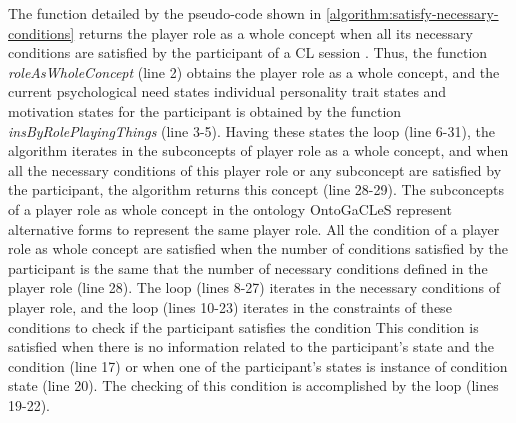 The function  detailed by the pseudo-code shown in \autoref{algorithm:satisfy-necessary-conditions} returns the player role as a whole concept when all its necessary conditions are satisfied by the participant  of a CL session . Thus, the function \emph{roleAsWholeConcept} (line 2) obtains the player role as a whole concept, and the current psychological need states  individual personality trait states  and motivation states  for the participant  is obtained by the function \emph{insByRolePlayingThings} (line 3-5). Having these states the loop  (line 6-31), the algorithm iterates in the subconcepts of player role as a whole concept, and when all the necessary conditions of this player role or any subconcept are satisfied by the participant, the algorithm returns this concept (line 28-29). The subconcepts of a player role as whole concept in the ontology OntoGaCLeS represent alternative forms to represent the same player role. All the condition of a player role as whole concept are satisfied when the number of conditions  satisfied by the participant  is the same that the number of necessary conditions defined in the player role (line 28). The loop  (lines 8-27) iterates in the necessary conditions of player role, and the loop  (lines 10-23) iterates in the constraints of these conditions to check if the participant  satisfies the condition  This condition is satisfied when there is no information related to the participant's state and the condition (line 17) or when one of the participant's states is instance of condition state (line 20). The checking of this condition is accomplished by the loop  (lines 19-22).

